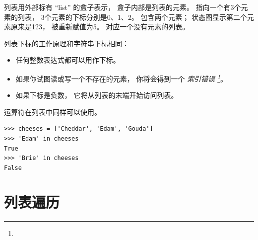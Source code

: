 列表用外部标有 ``list'' 的盒子表示， 盒子内部是列表的元素。   指向一个有3个元素的列表， 3个元素的下标分别是0、1、2。   包含两个元素；
状态图显示第二个元素原来是123， 被重新赋值为5。   对应一个没有元素的列表。


列表下标的工作原理和字符串下标相同：


\begin{itemize}

\item 任何整数表达式都可以用作下标。

\item 如果你试图读或写一个不存在的元素， 你将会得到一个 {\em 索引错误 \footnote{ }}。
  

\item 如果下标是负数， 它将从列表的末端开始访问列表。

\end{itemize}
  
  


 运算符在列表中同样可以使用。

\begin{lstlisting}
>>> cheeses = ['Cheddar', 'Edam', 'Gouda']
>>> 'Edam' in cheeses
True
>>> 'Brie' in cheeses
False
\end{lstlisting}


\section{列表遍历}
  
  
  
  

